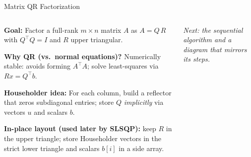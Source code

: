 \begin{frame}{Matrix QR Factorization}
  \begin{columns}[T,onlytextwidth]

    \begin{tightitem}
      \item \textbf{Goal:} Factor a full-rank $m\times n$ matrix $A$ as $A = Q\,R$
            with $Q^{\top}Q = I$ and $R$ upper triangular.
      \item \textbf{Why QR (vs.\ normal equations)?} Numerically stable:
            avoids forming $A^{\top}A$; solve least-squares via $R x = Q^{\top} b$.
      \item \textbf{Householder idea:} For each column, build a reflector that
            zeros subdiagonal entries; store $Q$ \emph{implicitly} via vectors $u$
            and scalars $b$.
      \item \textbf{In-place layout (used later by SLSQP):} keep $R$ in the
            upper triangle; store Householder vectors in the strict lower
            triangle and scalars $b[i]$ in a side array.
    \end{tightitem}

    \vspace{2mm}
    \small \textit{Next: the sequential algorithm and a diagram that mirrors its steps.}

    \centering

  \end{columns}
\end{frame}
